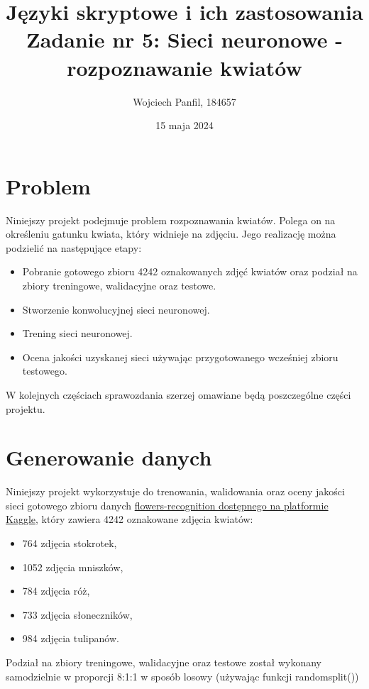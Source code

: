 \documentclass[11pt]{article}
\title{
	\textbf{Języki skryptowe i ich zastosowania}\\
	Zadanie nr 5: Sieci neuronowe - rozpoznawanie kwiatów}
\author{Wojciech Panfil, 184657}
\date{15 maja 2024}
\begin{document}
	\maketitle

	\section{Problem}
	Niniejszy projekt podejmuje problem rozpoznawania kwiatów. Polega on na określeniu
	gatunku kwiata, który widnieje na zdjęciu. Jego realizację można podzielić na następujące etapy:
	\begin{itemize}
		\item Pobranie gotowego zbioru 4242 oznakowanych zdjęć kwiatów oraz podział na zbiory treningowe, walidacyjne oraz testowe.
		\item Stworzenie konwolucyjnej sieci neuronowej.
		\item Trening sieci neuronowej.
		\item Ocena jakości uzyskanej sieci używając przygotowanego wcześniej zbioru testowego.
	\end{itemize}

	W kolejnych częściach sprawozdania szerzej omawiane będą poszczególne części projektu.

	\section{Generowanie danych}
	Niniejszy projekt wykorzystuje do trenowania, walidowania oraz oceny jakości sieci gotowego
	zbioru danych \href{https://www.kaggle.com/datasets/alxmamaev/flowers-recognition}{flowers-recognition dostępnego na platformie Kaggle},
	który zawiera 4242 oznakowane zdjęcia kwiatów:
	\begin{itemize}
		\item 764 zdjęcia stokrotek,
		\item 1052 zdjęcia mniszków,
		\item 784 zdjęcia róż,
		\item 733 zdjęcia słoneczników,
		\item 984 zdjęcia tulipanów.
	\end{itemize}
	Podział na zbiory treningowe, walidacyjne oraz testowe został wykonany samodzielnie w proporcji 8:1:1 w sposób losowy
	(używając funkcji randomsplit())
\end{document}
